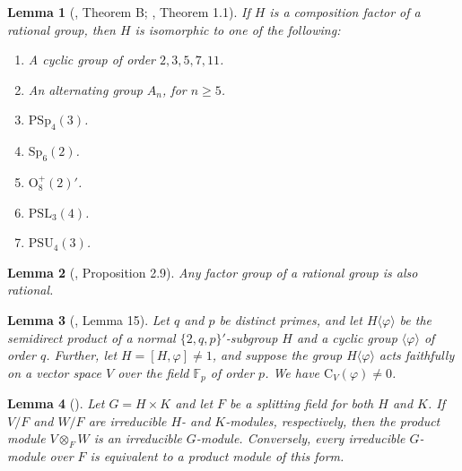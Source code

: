 \documentclass[11pt]{article}
\providecommand{\PSp}{{\mathrm{PSp}}}
\providecommand{\C}{{\mathrm{C}}}
\newtheorem{lem}{Lemma}
\begin{document}
\begin{lem}[\cite{Feit1988}, Theorem B; \cite{Thompson2008}, Theorem 1.1]
\label{RF}
    If $H$ is a composition factor of a rational group, 
    then $H$ is isomorphic to one of the following:

    \begin{enumerate}[label=(\arabic*), noitemsep]

    \item A cyclic group of order $2, 3, 5, 7, 11$.
    \item An alternating group $A_n$, for $n\geq 5$.
    \item $\PSp_4(3)$.
    \item $\mathrm{Sp}_6(2)$.
    \item $\mathrm{O}^{+}_{8}(2)'$.
    \item $\mathrm{PSL}_3(4)$.
    \item $\mathrm{PSU}_4(3)$.
    
    \end{enumerate}
\end{lem}


    

\begin{lem}[\cite{Arad2004B}, Proposition 2.9]
\label{Factor}
    Any factor group of a rational group is also rational.
\end{lem}







\begin{lem}[\cite{Mazurov2006}, Lemma 15]
\label{Mazurov06}
    Let  $q$ and $p$ be distinct primes, 
    and let $H \langle \varphi \rangle$ be the semidirect product of a normal 
    $\{2, q, p\}'$-subgroup \( H \) and a cyclic group $\langle \varphi \rangle$ of order $q$. 
    Further, let  $H = [H, \varphi] \neq 1$, 
    and suppose the group $H \langle \varphi \rangle$ acts faithfully 
    on a vector space $V$ over the field $\mathbb{F}_p$ of order  $p$. 
    We have $\C_V(\varphi) \neq 0$.
\end{lem}

\begin{lem}[{\cite[Theorem 7.1]{Gorenstein}}]
\label{gore71}
    Let $G = H \times K$ and let $F$ be a splitting field for both $H$ and $K$. If $V/F$ and $W/F$ are irreducible $H$- and $K$-modules, respectively, then the product module $V \otimes_F W$ is an irreducible $G$-module. Conversely, every irreducible $G$-module over $F$ is equivalent to a product module of this form.
\end{lem}
\end{document}
